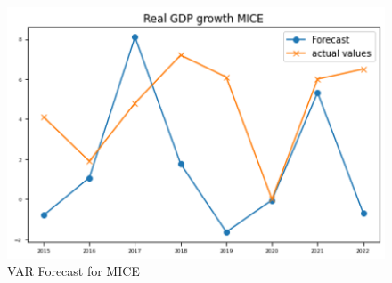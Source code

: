 \documentclass[12pt,italian, twoside]{report}
\begin{document}
\\
\begin{figure}[t]
	\centering
	\includegraphics[width = 130mm]{immagini/vfor1.png}
	\caption{VAR Forecast for MICE}
	\label{fig: var_mice}
\end{figure}
\end{document}
